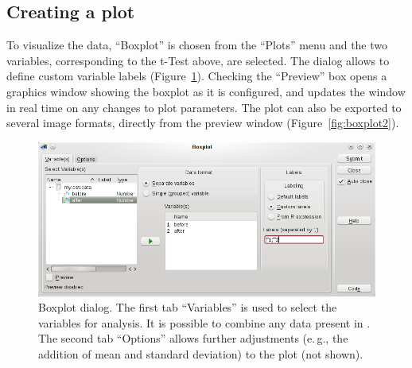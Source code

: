\subsection{Creating a plot}
\label{sec:create_plot}
To visualize the data, ``Boxplot'' is chosen from the ``Plots'' menu
and the two variables, corresponding to the t-Test above, are selected.
The dialog allows to define custom variable labels (Figure~\ref{fig:boxplot1}).
Checking the ``Preview'' box opens a graphics window showing the boxplot as
it is configured, and updates the window in real time on any changes to plot parameters.
The plot can also be exported to several image formats, directly from the preview window (Figure~\ref{fig:boxplot2}).

\begin{figure}[t!]
 \centering
 \includegraphics[width=15.4cm]{./figures/boxplot1.png}
 \caption{Boxplot dialog. The first tab ``Variables'' is used to select the variables for analysis. It is possible to
  combine any data present in . The second tab ``Options'' allows further adjustments (e.\,g., the addition of mean and standard deviation) to the plot (not shown).}
 \label{fig:boxplot1}
\end{figure}

